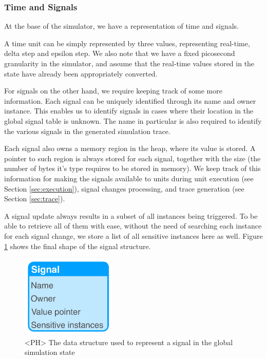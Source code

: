 
\subsubsection{Time and Signals}
At the base of the simulator, we have a representation of time and signals.

A time unit can be simply represented by three values, representing real-time, delta step and epsilon step. We also note that we have a fixed picosecond granularity in the simulator, and assume that the real-time values stored in the state have already been appropriately converted.

For signals on the other hand, we require keeping track of some more information. Each signal can be uniquely identified through its name and owner instance. This enables us to identify signals in cases where their location in the global signal table is unknown. The name in particular is also required to identify the various signals in the generated simulation trace.

Each signal also owns a memory region in the heap, where its value is stored. A pointer to such region is always stored for each signal, together with the size (\ie the number of bytes it's type requires to be stored in memory). We keep track of this information for making the signals available to units during unit execution (see Section \ref{sec:execution}), signal changes processing, and trace generation (see Section \ref{sec:trace}).

A signal update always results in a subset of all instances being triggered. To be able to retrieve all of them with ease, without the need of searching each instance for each signal change, we store a list of all sensitive instances here as well. Figure \ref{fig:sig} shows the final shape of the signal structure.

\begin{figure}[ht]
    \centering
    \includegraphics[width=0.4\textwidth]{gfx/Signal.png}
    \caption{<PH> The data structure used to represent a signal in the global simulation state}
    \label{fig:sig}
\end{figure}

